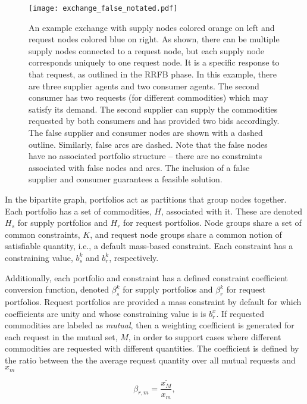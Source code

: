 \begin{figure}
  \begin{center}
    \texttt{[image: exchange\_false\_notated.pdf]}
    \caption{An example exchange with supply nodes colored orange on left
      and request nodes colored blue on right. As shown, there can be multiple
      supply nodes connected to a request node, but each supply node corresponds
      uniquely to one request node. It is a specific response to that request,
      as outlined in the RRFB phase. In this example, there are three
      supplier agents and two consumer agents. The second consumer has two
      requests (for different commodities) which may satisfy its demand. The
      second supplier can supply the commodities requested by both consumers and
      has provided two bids accordingly. The false supplier and consumer nodes are
      shown with a dashed outline. Similarly, false arcs are dashed. Note that
      the false nodes have no associated portfolio structure -- there are no
      constraints associated with false nodes and arcs. The inclusion of a false
      supplier and consumer guarantees a feasible solution.}
    \label{fig:ex_false}
  \end{center}
\end{figure}

In the bipartite graph, portfolios act as partitions that group nodes together.
Each portfolio has a set of commodities, $H$, associated with it. These are
denoted $H_s$ for supply portfolios and $H_r$ for request portfolios. Node
groups share a set of common constraints, $K$, and request node groups share a
common notion of satisfiable quantity, i.e., a default mass-based
constraint. Each constraint has a constraining value, $b_s^k$ and $b_r^k$,
respectively.

Additionally, each portfolio and constraint has a defined constraint coefficient
conversion function, denoted $\beta_s^k$ for supply portfolios and $\beta_r^k$
for request portfolios. Request portfolios are provided a mass constraint by
default for which coefficients are unity and whose constraining value is is
$b^{x}_{r}$. If requested commodities are labeled as \textit{mutual}, then a
weighting coefficient is generated for each request in the mutual set, $M$, in
order to support cases where different commodities are requested with different
quantities. The coefficient is defined by the ratio between the the average
request quantity over all mutual requests and $x_m$

\begin{equation}\label{meth:mutual-coeff}
  \beta_{r, m} = \frac{\overline{x_M}}{x_m},
\end{equation}


